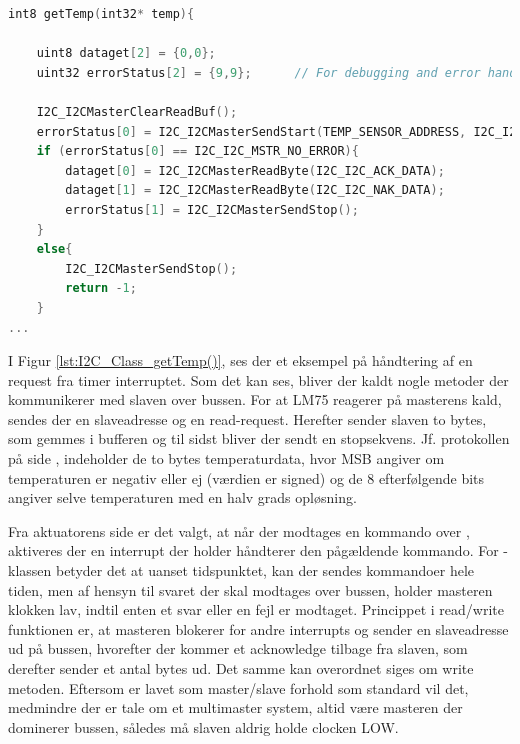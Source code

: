 \begin{lstlisting}[language=C,caption=Implementering af getTemp(),label=lst:I2C_Class_getTemp()]
int8 getTemp(int32* temp){

    uint8 dataget[2] = {0,0};
    uint32 errorStatus[2] = {9,9};      // For debugging and error handling
    
    I2C_I2CMasterClearReadBuf();
    errorStatus[0] = I2C_I2CMasterSendStart(TEMP_SENSOR_ADDRESS, I2C_I2C_READ_XFER_MODE);
    if (errorStatus[0] == I2C_I2C_MSTR_NO_ERROR){
        dataget[0] = I2C_I2CMasterReadByte(I2C_I2C_ACK_DATA);
        dataget[1] = I2C_I2CMasterReadByte(I2C_I2C_NAK_DATA);
        errorStatus[1] = I2C_I2CMasterSendStop();
    }
    else{
        I2C_I2CMasterSendStop();
        return -1;
    }
...
\end{lstlisting}

I Figur \ref{lst:I2C_Class_getTemp()}, ses der et eksempel på håndtering af en request fra timer interruptet. 
Som det kan ses, bliver der kaldt nogle metoder der kommunikerer med slaven over bussen. For at LM75 reagerer på masterens kald, sendes der en slaveadresse og en read-request. Herefter sender slaven to bytes, som gemmes i bufferen og til sidst bliver der sendt en stopsekvens. Jf. \IIC protokollen på side \pageref{sec:I2C_protokol}, indeholder de to bytes temperaturdata, hvor MSB angiver om temperaturen er negativ eller ej (værdien er signed) og de 8 efterfølgende bits angiver selve temperaturen med en halv grads opløsning. 

Fra aktuatorens side er det valgt, at når der modtages en kommando over \IIC, aktiveres der en interrupt der holder håndterer den pågældende kommando. For \IIC-klassen betyder det at uanset tidspunktet, kan der sendes kommandoer hele tiden, men af hensyn til svaret der skal modtages over bussen, holder masteren klokken lav, indtil enten et svar eller en fejl er modtaget. Princippet i read/write funktionen er, at masteren blokerer for andre interrupts og sender en slaveadresse ud på bussen, hvorefter der kommer et acknowledge tilbage fra slaven, som derefter sender et antal bytes ud. Det samme kan overordnet siges om write metoden. Eftersom \IIC er lavet som master/slave forhold som standard vil det, medmindre der er tale om et multimaster system, altid være masteren der dominerer bussen, således må slaven aldrig holde clocken LOW. 


